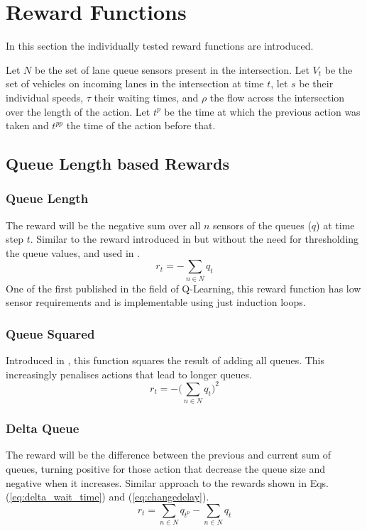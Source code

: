 \documentclass[conference]{IEEEtran}
\begin{document}
\section{Reward Functions} \label{rewards}
In this section the individually tested reward functions are introduced.

Let $N$ be the set of lane queue sensors present in the intersection.
Let $V_t$ be the set of vehicles on incoming lanes in the intersection at time $t$, let $s$ be their individual speeds, $\tau$ their waiting times, and $\rho$ the flow across the intersection over the length of the action.
Let $t^p$ be the time at which the previous action was taken and $t^{pp}$ the time of the action before that.

\subsection{Queue Length based Rewards}
\subsubsection{Queue Length}
The reward will be the negative sum over all $n$ sensors of the queues ($q$) at time step $t$.
Similar to the reward introduced in \cite{prashanth2011} but without the need for thresholding the queue values, and used in \cite{aslani2019}.
\begin{equation}
    r_t = - \sum_{n \in N} q_{t}
\label{eq:queue}
\end{equation}
One of the first published in the field of Q-Learning, this reward function has low sensor requirements and is implementable using just induction loops.

\subsubsection{Queue Squared}
Introduced in \cite{gendersthesis}, this function squares the result of adding all queues.
This increasingly penalises actions that lead to longer queues.
\begin{equation}
   r_t = - \bigg( \sum_{n \in N} q_{t} \bigg)^2
\label{eq:queuesq} 
\end{equation}

\subsubsection{Delta Queue}
The reward will be the difference between the previous and current sum of queues, turning positive for those action that decrease the queue size and negative when it increases.
Similar approach to the rewards shown in Eqs. (\ref{eq:delta_wait_time}) and (\ref{eq:changedelay}).
\begin{equation}
    r_t = \sum_{n \in N} q_{t^p} - \sum_{n \in N} q_{t}
    \label{deltaqueue}
\end{equation}
\end{document}
